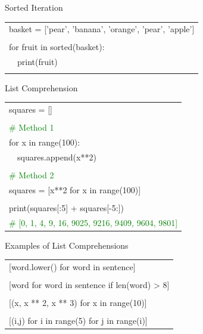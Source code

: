 \documentclass[serif, aspectratio=169]{beamer}
\newcommand{\tgreen}[1]{\textcolor{green}{#1}}
\newenvironment{CLI} %
    {
    \noindent
    \ttfamily 
    \footnotesize
    \begin{tcolorbox}[colback=gray!150,colframe=black]
    \color{white}
    \begin{tabular}{p{4.5cm}p{7.5cm}}
    }
    { 
    \end{tabular}
    \end{tcolorbox}
    }
\begin{document}
\begin{frame}{Sorted Iteration}
    \begin{CLI}
        \multicolumn{2}{l}{basket = ['pear', 'banana', 'orange', 'pear', 'apple']} \\
        & \\
        \multicolumn{2}{l}{for fruit in sorted(basket):} \\
        ~~print(fruit)& \\
        & \\
    \end{CLI}
\end{frame}

\begin{frame}{List Comprehension}
    \begin{CLI}
        squares = [] & \\
        & \\
        \tgreen{\# Method 1} & \\
        for x in range(100): & \\
        ~~squares.append(x**2) & \\
        & \\
        \tgreen{\# Method 2} & \\
        \multicolumn{2}{l}{squares = [x**2 for x in range(100)]} \\
        & \\
        \multicolumn{2}{l}{print(squares[:5] + squares[-5:])} \\
        \multicolumn{2}{l}{\tgreen{\# [0, 1, 4, 9, 16, 9025, 9216, 9409, 9604, 9801]}} \\
    \end{CLI}
\end{frame}

\begin{frame}{Examples of List Comprehensions}
    \begin{CLI}
        \multicolumn{2}{l}{[word.lower() for word in sentence]} \\
        & \\
        \multicolumn{2}{l}{[word for word in sentence if len(word) > 8]} \\
        & \\
        \multicolumn{2}{l}{[(x, x ** 2, x ** 3) for x in range(10)]} \\
        & \\
        \multicolumn{2}{l}{[(i,j) for i in range(5) for j in range(i)]} \\
    \end{CLI}
\end{frame}
\end{document}
